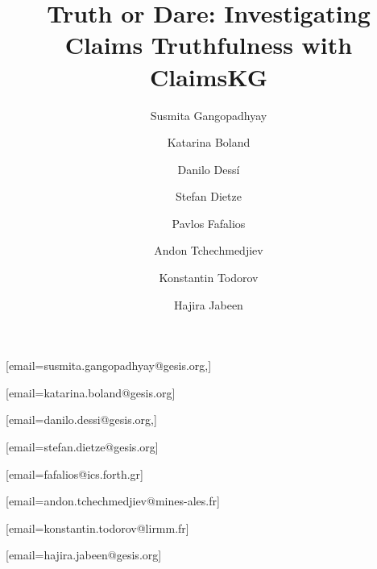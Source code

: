 \documentclass[
]{ceurart}
\begin{document}

\conference{}


\title{Truth or Dare: Investigating Claims Truthfulness with ClaimsKG}



\address[1]{%
KTS Department, GESIS – Leibniz Institute for the Social Sciences, Cologne, Germany}
\address[2]{Heinrich-Heine-University Dusseldorf, Dusseldorf, Germany}
\address[3]{Institute of Computer Science, FORTH-ICS, Greece}
\address[4]{EuroMov Digital Health in Motion, Univ. Montpellier, IMT Mines Alès, Alès, France}
\address[5]{LIRMM / University of Montpellier / CNRS, France}

\author[1]{Susmita Gangopadhyay}[email=susmita.gangopadhyay@gesis.org,]
\author[1]{Katarina Boland}[email=katarina.boland@gesis.org]
\author[1]{Danilo Dess{\'i}}[email=danilo.dessi@gesis.org,]
\author[1,2]{Stefan Dietze}[email=stefan.dietze@gesis.org]
\author[3]{Pavlos Fafalios}[email=fafalios@ics.forth.gr]
\author[4]{Andon Tchechmedjiev}[email=andon.tchechmedjiev@mines-ales.fr]
\author[5]{Konstantin Todorov}[email=konstantin.todorov@lirmm.fr]
\author[1]{Hajira Jabeen}[email=hajira.jabeen@gesis.org]

\end{document}
